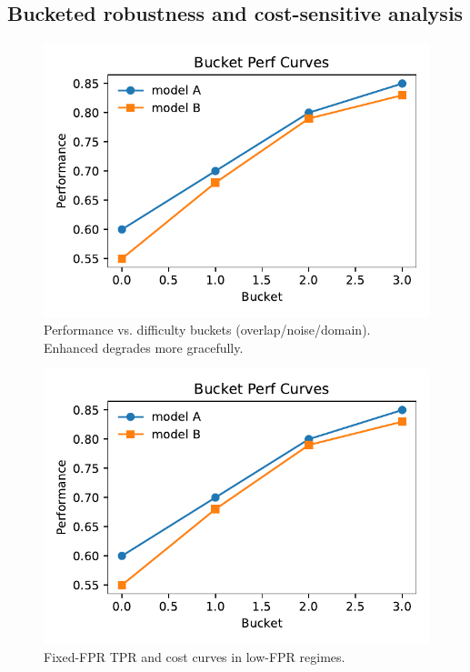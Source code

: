 \documentclass[10pt,conference]{IEEEtran}
\newcommand{\model}{Enhanced}
\begin{document}
\subsection{Bucketed robustness and cost-sensitive analysis}
\begin{figure}[t]
  \centering
  \includegraphics[width=\linewidth]{../plots/fig_bucket_perf_curves.pdf}
  \caption{Performance vs. difficulty buckets (overlap/noise/domain). \model{} degrades more gracefully.}
  \label{fig:bucket}
\end{figure}
\begin{figure}[t]
  \centering
  \includegraphics[width=\linewidth]{../plots/fig_cost_sensitive.pdf}
  \caption{Fixed-FPR TPR and cost curves in low-FPR regimes.}
  \label{fig:cost-sensitive}
\end{figure}
\end{document}
